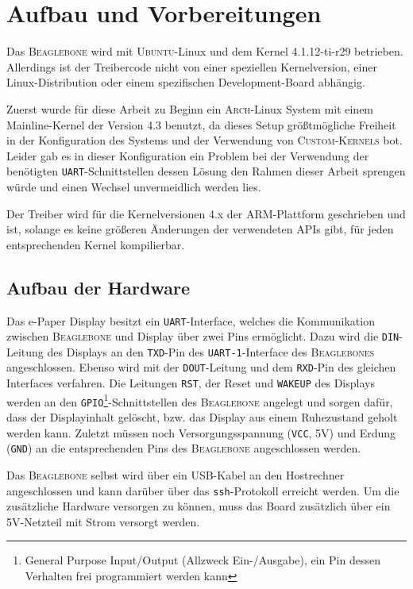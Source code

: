 \chapter{Aufbau und Vorbereitungen} %
Das \textsc{Beaglebone} wird mit \textsc{Ubuntu}-Linux und dem Kernel 4.1.12-ti-r29 betrieben. Allerdings ist der Treibercode nicht von einer speziellen Kernelversion, einer Linux-Distribution oder einem spezifischen Development-Board abhängig. 

Zuerst wurde für diese Arbeit zu Beginn ein \textsc{Arch}-Linux System mit einem Mainline-Kernel der Version 4.3 benutzt, da dieses Setup größtmögliche Freiheit in der Konfiguration des Systems und der Verwendung von \textsc{Custom-Kernels} bot. Leider gab es in dieser Konfiguration ein Problem bei der Verwendung der benötigten \texttt{UART}-Schnittstellen dessen Lösung den Rahmen dieser Arbeit sprengen würde und einen Wechsel unvermeidlich werden lies.

Der Treiber wird für die Kernelversionen 4.x der \textsc{ARM}-Plattform geschrieben und ist, solange es keine größeren Änderungen der verwendeten APIs gibt, für jeden entsprechenden Kernel kompilierbar.

\section{Aufbau der Hardware}
Das e-Paper Display besitzt ein \texttt{UART}-Interface, welches die Kommunikation zwischen \textsc{Beaglebone} und Display über zwei Pins ermöglicht. Dazu wird die \texttt{DIN}-Leitung des Displays an den \texttt{TXD}-Pin des \texttt{UART-1}-Interface des \textsc{Beaglebones} angeschlossen. Ebenso wird mit der \texttt{DOUT}-Leitung und dem \texttt{RXD}-Pin des gleichen Interfaces verfahren. Die Leitungen \texttt{RST}, der Reset und \texttt{WAKEUP} des Displays werden an den \texttt{GPIO}\footnote{General Purpose Input/Output (Allzweck Ein-/Ausgabe), ein Pin dessen Verhalten frei programmiert werden kann}-Schnittstellen des \textsc{Beaglebone} angelegt und sorgen dafür, dass der Displayinhalt gelöscht, bzw. das Display aus einem Ruhezustand geholt werden kann. Zuletzt müssen noch Versorgungsspannung (\texttt{VCC}, 5V) und Erdung (\texttt{GND}) an die entsprechenden Pins des \textsc{Beaglebone} angeschlossen werden.  

Das \textsc{Beaglebone} selbst wird über ein USB-Kabel an den Hostrechner angeschlossen und kann darüber über das \texttt{ssh}-Protokoll erreicht werden. Um die zusätzliche Hardware versorgen zu können, muss das Board zusätzlich über ein 5V-Netzteil mit Strom versorgt werden. 

